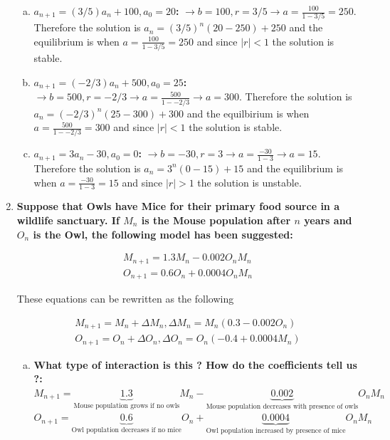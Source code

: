 \documentclass{article}
\begin{document}
\begin{enumerate}[1.]
\begin{enumerate}[(a)]
  \item \textbf{$a_{n+1} = (3/5)a_n + 100, a_0 = 20$:}
$\to b = 100, r = 3/5 \to a = \frac{100}{1 - 3/5} = 250$. Therefore the solution is $a_n = (3/5)^n(20 - 250) + 250$ and the equilibrium is when $a = \frac{100}{1 - 3/5} = 250$ and since $|r| < 1$ the solution is stable.

  \item \textbf{$a_{n+1} = (-2/3)a_n + 500, a_0 = 25$:} 
$\to b = 500, r=-2/3 \to a = \frac{500}{1 - -2/3} \to a = 300$. 
Therefore the solution is $a_n = (-2/3)^n(25 - 300) + 300$ and the equilbirium is when $a = \frac{500}{1 - -2/3} = 300$ and since $|r| < 1$ the solution is stable.

  \item \textbf{$a_{n+1} = 3a_n - 30, a_0 = 0$:} 
$\to b = -30, r=3 \to a = \frac{-30}{1 - 3} \to a = 15$. Therefore the solution is $a_n = 3^n(0 - 15) + 15$ and the equilibrium is when $a = \frac{-30}{1-3} = 15$ and since $|r| > 1$ the solution is unstable.
\end{enumerate}

\item 
\textbf{Suppose that Owls have Mice for their primary food source in a wildlife sanctuary. If $M_n$ is the Mouse population after $n$ years and $O_n$ is the Owl, the following model has been suggested:}

\begin{gather*}
M_{n+1} = 1.3M_n - 0.002O_nM_n \\
O_{n+1} = 0.6O_n + 0.0004O_nM_n
\end{gather*}

These equations can be rewritten as the following

\begin{gather*}
M_{n+1} = M_n + \Delta M_n, \Delta M_n = M_n(0.3 - 0.002O_n) \\
O_{n+1} = O_n + \Delta O_n, \Delta O_n = O_n(-0.4 + 0.0004M_n)
\end{gather*}

\begin{enumerate}[(a)]
\item
\textbf{What type of interaction is this ? How do the coefficients tell us ?:} \\
$M_{n+1} = \underbrace{1.3}_{\text{Mouse population grows if no owls}}M_n - \underbrace{0.002}_{\text{Mouse population decreases with presence of owls}}O_nM_n$ \\
$O_{n+1} =  \underbrace{0.6}_{\text{Owl population decreases if no mice}}O_n + \underbrace{0.0004}_{\text{Owl population increased by presence of mice}}O_nM_n$ \\


\end{enumerate}
\end{enumerate}
\end{document}
